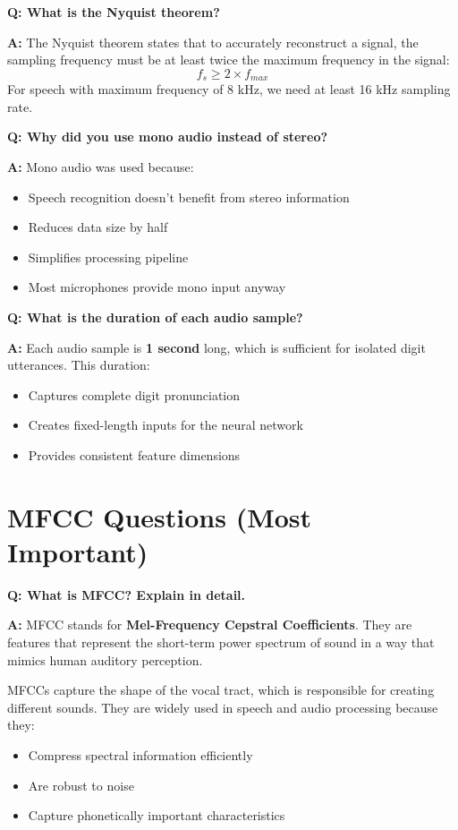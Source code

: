 \documentclass[a4paper,12pt]{article}
\newcommand{\vivaQ}[1]{\textcolor{questioncolor}{\textbf{Q: #1}}}
\newcommand{\vivaA}[1]{\textcolor{answercolor}{\textbf{A:}} #1}
\begin{document}
\vspace{0.5cm}

\vivaQ{What is the Nyquist theorem?}

\vivaA{The Nyquist theorem states that to accurately reconstruct a signal, the sampling frequency must be at least twice the maximum frequency in the signal:
\[f_s \geq 2 \times f_{max}\]
For speech with maximum frequency of 8 kHz, we need at least 16 kHz sampling rate.}

\vspace{0.5cm}

\vivaQ{Why did you use mono audio instead of stereo?}

\vivaA{Mono audio was used because:
\begin{itemize}
    \item Speech recognition doesn't benefit from stereo information
    \item Reduces data size by half
    \item Simplifies processing pipeline
    \item Most microphones provide mono input anyway
\end{itemize}}

\vspace{0.5cm}

\vivaQ{What is the duration of each audio sample?}

\vivaA{Each audio sample is \textbf{1 second} long, which is sufficient for isolated digit utterances. This duration:
\begin{itemize}
    \item Captures complete digit pronunciation
    \item Creates fixed-length inputs for the neural network
    \item Provides consistent feature dimensions
\end{itemize}}

\section{MFCC Questions (Most Important)}

\vivaQ{What is MFCC? Explain in detail.}

\vivaA{MFCC stands for \textbf{Mel-Frequency Cepstral Coefficients}. They are features that represent the short-term power spectrum of sound in a way that mimics human auditory perception.

MFCCs capture the shape of the vocal tract, which is responsible for creating different sounds. They are widely used in speech and audio processing because they:
\begin{itemize}
    \item Compress spectral information efficiently
    \item Are robust to noise
    \item Capture phonetically important characteristics
\end{itemize}}
\end{document}

